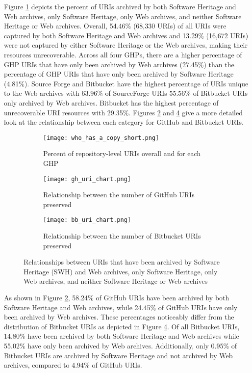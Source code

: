 Figure \ref{fig:who_has_a_copy} depicts the percent of URIs archived by both Software Heritage and Web archives, only Software Heritage, only Web archives, and neither Software Heritage or Web archives. Overall, 54.46\% (68,330 URIs) of all URIs were captured by both Software Heritage and Web archives and 13.29\% (16,672 URIs) were not captured by either Software Heritage or the Web archives, making their resources unrecoverable. Across all four GHPs, there are a higher percentage of GHP URIs that have only been archived by Web archives (27.45\%) than the percentage of GHP URIs that have only been archived by Software Heritage (4.81\%). Source Forge and Bitbucket have the highest percentage of URIs unique to the Web archives with 63.96\% of SourceForge URIs 55.56\% of Bitbucket URIs only archived by Web archives. Bitbucket has the highest percentage of unrecoverable URI resources with 29.35\%. Figures \ref{fig:gh_sankey} and \ref{fig:bb_sankey} give a more detailed look at the relationship between each category for GitHub and Bitbucket URIs.  

\begin{figure}
\centering
\begin{subfigure}{0.9\textwidth}
    \texttt{[image: who\_has\_a\_copy\_short.png]}
    \caption{Percent of repository-level URIs overall and for each GHP}
    \label{fig:who_has_a_copy}
\end{subfigure}
\begin{subfigure}{0.9\textwidth}
    \centering
    \texttt{[image: gh\_uri\_chart.png]}
    \caption{Relationship between the number of GitHub URIs preserved}
    \label{fig:gh_sankey}
\end{subfigure}
\begin{subfigure}{0.9\textwidth}
    \centering
    \texttt{[image: bb\_uri\_chart.png]}
    \caption{Relationship between the number of Bitbucket URIs preserved}
    \label{fig:bb_sankey}
\end{subfigure}
\caption{Relationships between URIs that have been archived by Software Heritage (SWH) and Web archives, only Software Heritage, only Web archives, and neither Software Heritage or Web archives}
\end{figure}

As shown in Figure \ref{fig:gh_sankey}, 58.24\% of GitHub URIs have been archived by both Software Heritage and Web archives, while 24.45\% of GitHub URIs have only been archived by Web archives. These percentages noticeably differ from the distribution of Bitbucket URIs as depicted in Figure 
\ref{fig:bb_sankey}. Of all Bitbucket URIs, 14.80\% have been archived by both Software Heritage and Web archives while 55.02\% have only been archived by Web archives. Additionally, only 0.95\% of Bitbucket URIs are archived by Software Heritage and not archived by Web archives, compared to 4.94\% of GitHub URIs. 

